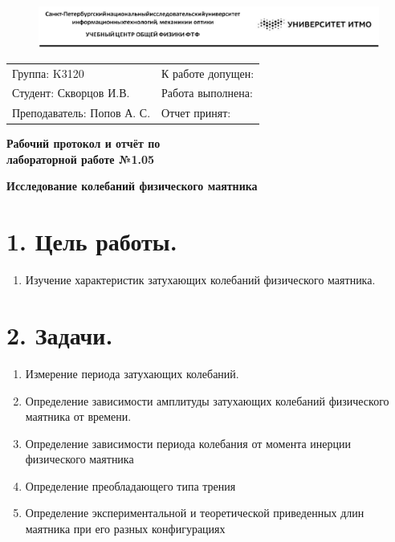 \documentclass[14pt]{extreport}
\begin{document}
\begin{figure}[]
		\includegraphics[scale=0.66]{itmo_image.png}
		\label{pic1}
\end{figure}
\begin{flushleft}
\begin{tabular}{ p{9cm}p{8cm} }
 Группа: K3120 & К работе допущен: \\ 
 Студент: Скворцов И.В. & Работа выполнена: \\  
 Преподаватель: Попов А. С. & Отчет принят: \\    
\end{tabular}
\end{flushleft}

\begin{center}
\Large\textbf{Рабочий протокол и отчёт по\\лабораторной работе №1.05}

\large\textbf{Исследование колебаний физического маятника}
\end{center}

\section*{1. Цель работы.}

\begin{enumerate}
    \item Изучение характеристик затухающих колебаний физического маятника. 
\end{enumerate}

\section*{2. Задачи.}
\begin{enumerate}
    \item Измерение периода затухающих колебаний.
    \item Определение зависимости амплитуды затухающих колебаний физического маятника от времени.
    \item  Определение зависимости периода колебания от момента инерции физического маятника
    \item Определение преобладающего типа трения
    \item Определение экспериментальной и теоретической приведенных длин маятника при его разных конфигурациях
\end{enumerate}
\end{document}
